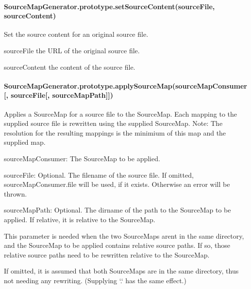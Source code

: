 \paragraph*{Source\+Map\+Generator.\+prototype.\+set\+Source\+Content(source\+File, source\+Content)}

Set the source content for an original source file.


\begin{DoxyItemize}
\item {\ttfamily source\+File} the U\+R\+L of the original source file.
\item {\ttfamily source\+Content} the content of the source file.
\end{DoxyItemize}

\paragraph*{Source\+Map\+Generator.\+prototype.\+apply\+Source\+Map(source\+Map\+Consumer\mbox{[}, source\+File\mbox{[}, source\+Map\+Path\mbox{]}\mbox{]})}

Applies a Source\+Map for a source file to the Source\+Map. Each mapping to the supplied source file is rewritten using the supplied Source\+Map. Note\+: The resolution for the resulting mappings is the minimium of this map and the supplied map.


\begin{DoxyItemize}
\item {\ttfamily source\+Map\+Consumer}\+: The Source\+Map to be applied.
\item {\ttfamily source\+File}\+: Optional. The filename of the source file. If omitted, source\+Map\+Consumer.\+file will be used, if it exists. Otherwise an error will be thrown.
\item {\ttfamily source\+Map\+Path}\+: Optional. The dirname of the path to the Source\+Map to be applied. If relative, it is relative to the Source\+Map.

This parameter is needed when the two Source\+Maps aren\textquotesingle{}t in the same directory, and the Source\+Map to be applied contains relative source paths. If so, those relative source paths need to be rewritten relative to the Source\+Map.

If omitted, it is assumed that both Source\+Maps are in the same directory, thus not needing any rewriting. (Supplying `\textquotesingle{}.\textquotesingle{}` has the same effect.)
\end{DoxyItemize}

